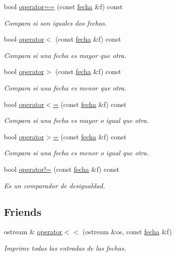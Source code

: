 \begin{DoxyCompactItemize}
bool \hyperlink{classfecha_ac971e131a6e3edf57c2313468524f364}{operator==} (const \hyperlink{classfecha}{fecha} \&f) const 
\begin{DoxyCompactList}\small\item\em Compara si son iguales dos fechas. \end{DoxyCompactList}\item 
bool \hyperlink{classfecha_a27803300b9698e1a40ef48f2009948c5}{operator$<$} (const \hyperlink{classfecha}{fecha} \&f) const 
\begin{DoxyCompactList}\small\item\em Compara si una fecha es mayor que otra. \end{DoxyCompactList}\item 
bool \hyperlink{classfecha_aaded7646e80d88492b31b17b4fb001fd}{operator$>$} (const \hyperlink{classfecha}{fecha} \&f) const 
\begin{DoxyCompactList}\small\item\em Compara si una fecha es menor que otra. \end{DoxyCompactList}\item 
bool \hyperlink{classfecha_a8dfb2f2a7424bdb1dacc6df122b0a0c8}{operator$<$=} (const \hyperlink{classfecha}{fecha} \&f) const 
\begin{DoxyCompactList}\small\item\em Compara si una fecha es mayor o igual que otra. \end{DoxyCompactList}\item 
bool \hyperlink{classfecha_a98d0f3009cb7205b5ddb3b81596d9cc7}{operator$>$=} (const \hyperlink{classfecha}{fecha} \&f) const 
\begin{DoxyCompactList}\small\item\em Compara si una fecha es menor o igual que otra. \end{DoxyCompactList}\item 
bool \hyperlink{classfecha_a1f6d28759c45b138efb80d25a7c398b8}{operator!=} (const \hyperlink{classfecha}{fecha} \&f) const 
\begin{DoxyCompactList}\small\item\em Es un comparador de desigualdad. \end{DoxyCompactList}\end{DoxyCompactItemize}
\subsection*{Friends}
\begin{DoxyCompactItemize}
\item 
ostream \& \hyperlink{classfecha_a9787de38b43ae62ba2c0812f3dd18394}{operator$<$$<$} (ostream \&os, const \hyperlink{classfecha}{fecha} \&f)
\begin{DoxyCompactList}\small\item\em Imprime todas las entradas de las fechas. \end{DoxyCompactList}\end{DoxyCompactItemize}


